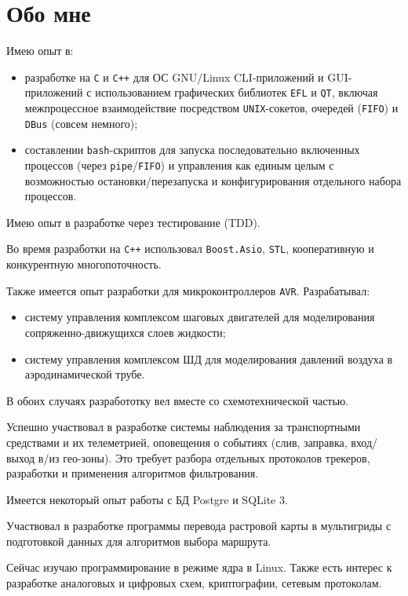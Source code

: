 \documentclass[11pt,a4paper,russian]{moderncv}
\begin{document}
\section{Обо мне}
\par{Имею опыт в:}
\begin{itemize}
\item разработке на \texttt{C} и \texttt{C++} для ОС GNU/Linux CLI-приложений и GUI-приложений с использованием графических библиотек \texttt{EFL} и \texttt{QT}, включая межпроцессное взаимодействие посредством \texttt{UNIX}-сокетов, очередей (\texttt{FIFO}) и \texttt{DBus} (совсем немного);
\item составлении \texttt{bash}-скриптов для запуска последовательно включенных процессов (через \texttt{pipe}/\texttt{FIFO}) и управления как единым целым с возможностью остановки/перезапуска и конфигурирования отдельного набора процессов.
\end{itemize}
\par{Имею опыт в разработке через тестирование (TDD).}
\par{Во время разработки на \texttt{C++} использовал \texttt{Boost.Asio}, \texttt{STL}, кооперативную и конкурентную многопоточность.}
\par{Также имеется опыт разработки для микроконтроллеров \texttt{AVR}. Разрабатывал:}
\begin{itemize}
\item систему управления комплексом шаговых двигателей для моделирования сопряженно-движущихся слоев жидкости;
\item систему управления комплексом ШД для моделирования давлений воздуха в аэродинамической трубе.
\end{itemize}
\par{В обоих случаях разработотку вел вместе со схемотехнической частью.}
\par{Успешно участвовал в разработке системы наблюдения за транспортными средствами и их телеметрией, оповещения о событиях (слив, заправка, вход/выход в/из гео-зоны). Это требует разбора отдельных протоколов трекеров, разработки и применения алгоритмов фильтрования.}
\par{Имеется некоторый опыт работы с БД Postgre и SQLite 3.}
\par{Участвовал в разработке программы перевода растровой карты в мультигриды с подготовкой данных для алгоритмов выбора маршрута.}
\par{Сейчас изучаю программирование в режиме ядра в Linux. Также есть интерес к разработке аналоговых и цифровых схем, криптографии, сетевым протоколам.}

\clearpage
\end{document}

